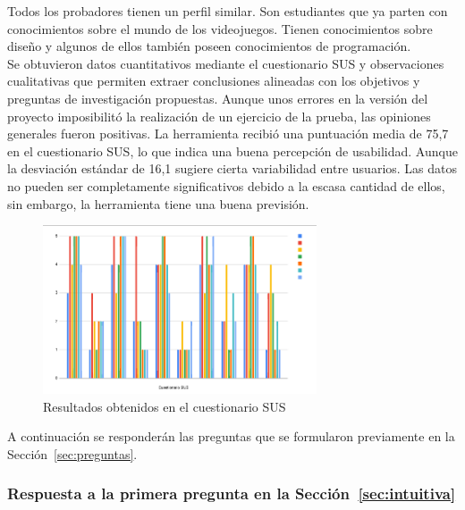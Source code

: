 Todos los probadores tienen un perfil similar. Son estudiantes que ya parten con conocimientos sobre el mundo de los videojuegos. Tienen conocimientos sobre diseño y algunos de ellos también poseen conocimientos de programación. \\

Se obtuvieron datos cuantitativos mediante el cuestionario SUS y observaciones cualitativas que permiten extraer conclusiones alineadas con los objetivos y preguntas de investigación propuestas. Aunque unos errores en la versión del proyecto imposibilitó la realización de un ejercicio de la prueba, las opiniones generales fueron positivas. La herramienta recibió una puntuación media de 75,7 en el cuestionario SUS, lo que indica una buena percepción de usabilidad. Aunque la desviación estándar de 16,1 sugiere cierta variabilidad entre usuarios. Las datos no pueden ser completamente significativos debido a la escasa cantidad de ellos, sin embargo, la herramienta tiene una buena previsión.\\

\begin{figure}[t]
	\centering
	\includegraphics[height=5cm]{Imagenes/ResultadosSUS.png}
	\caption{Resultados obtenidos en el cuestionario SUS}
	\label{fig:Cuestionario SUS}
\end{figure}

A continuación se responderán las preguntas que se formularon previamente en la Sección~\ref{sec:preguntas}.


\subsubsection{Respuesta a la primera pregunta en la Sección~\ref{sec:intuitiva}}

